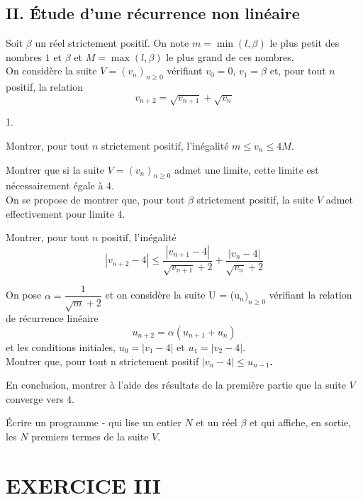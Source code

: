 \documentclass[11pt]{article}%
\begin{document}
\subsection*{II. Étude d'une récurrence non linéaire}

Soit $\beta $ un réel strictement positif. On note $m = \min (l,\beta
)$ le
plus petit des nombres $1$ et $\beta $ et $M = \max (l,\beta )$ le plus
grand
de ces nombres.\\
On considère la suite $V = (v_{n})_{n\geq 0}$ vérifiant $v_{0} = 0$,
$v_{1} = \beta $ et, pour tout $n$ positif, la relation
\[
v_{n + 2} = \sqrt{v_{n + 1}} + \sqrt{v_{n}}
\]

\begin{noliste}{1.}
 \setlength{\itemsep}{4mm}
\item Montrer, pour tout $n$ strictement positif, l'inégalité $m\leq
v_{n}\leq 4M.$

\item Montrer que si la suite $V = (v_{n})_{n\geq 0}$ admet une limite,
cette limite est nécessairement égale à $4$.\\
On se propose de montrer que, pour tout $\beta $ strictement positif,
la
suite $V$ admet effectivement pour limite $4$.

\item Montrer, pour tout $n$ positif, l'inégalité
\[
\left| v_{n + 2}-4\right| \leq \dfrac{\left|
v_{n + 1}-4\right| }{\sqrt{v_{n + 1}} + 2} + \dfrac{\left|
v_{n}-4\right| }{\sqrt{v_{n}} + 2}
\]

\item On pose $\alpha = \dfrac{1}{\sqrt{m} + 2}$ et on considère la
suite U = (u$_{n})_{n\geq 0}$ vérifiant la relation de récurrence
linéaire 
\[
u_{n + 2} = \alpha (u_{n + 1} + u_{n})
\]
et les conditions initiales, $u_{0} = \left| v_{1}-4\right| $ et $u_{1}
= \left| v_{2}-4\right| $. \\
Montrer que, pour tout n strictement positif $\left| v_{n}-4\right|
\leq u_{n-1}$\textbf{.}

\item En conclusion, montrer à l'aide des résultats de la première
partie
que la suite $V$ converge vers $4$.

\item Écrire un programme -\Scilab{} qui lise un entier $N$ et un réel
$\beta $ et qui affiche, en sortie, les $N$ premiers termes de la suite
$V$.
\end{noliste}

\section*{EXERCICE III}
\end{document}
